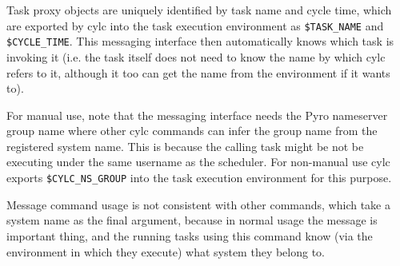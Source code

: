 
Task proxy objects are uniquely identified by task name and cycle time,
which are exported by cylc into the task execution environment as
\lstinline=$TASK_NAME= and \lstinline=$CYCLE_TIME=. This messaging
interface then automatically knows which task is invoking it (i.e. the
task itself does not need to know the name by which cylc refers to it,
although it too can get the name from the environment if it wants to).

For manual use, note that the messaging interface needs the Pyro
nameserver group name where other cylc commands can infer the group name
from the registered system name. This is because the calling task might
be not be executing under the same username as the scheduler. For
non-manual use cylc exports \lstinline=$CYLC_NS_GROUP= into the task
execution environment for this purpose. 

Message command usage is not consistent with other commands, which
take a system name as the final argument, because in normal usage 
the message is important thing, and the running tasks using this
command know (via the environment in which they execute) what system
they belong to.
